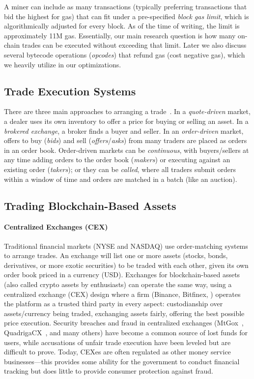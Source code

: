 A miner can include as many transactions (typically preferring transactions that bid the highest for gas) that can fit under a pre-specified \textit{block gas limit}, which is algorithmically adjusted for every block. As of the time of writing, the limit is approximately 11M gas. Essentially, our main research question is how many on-chain trades can be executed without exceeding that limit. Later we also discuss several bytecode operations (\emph{opcodes}) that refund gas (\ie cost negative gas), which we heavily utilize in our optimizations.

\subsection{Trade Execution Systems}



 There are three main approaches to arranging a trade~\cite{Har03}. In a \emph{quote-driven} market, a dealer uses its own inventory to offer a price for buying or selling an asset. In a \emph{brokered exchange}, a broker finds a buyer and seller. In an \emph{order-driven} market, offers to buy (\emph{bids}) and sell (\emph{offers}/\emph{asks}) from many traders are placed as orders in an order book. Order-driven markets can be \emph{continuous}, with buyers/sellers at any time adding orders to the order book (\emph{makers}) or executing against an existing order (\emph{takers}); or they can be \emph{called}, where all traders submit orders within a window of time and orders are matched in a batch (like an auction). 

\subsection{Trading Blockchain-Based Assets}

%

\paragraph[Centralized Exchanges (CEX)]{Centralized Exchanges (CEX)\eatpunct} Traditional financial markets (\eg NYSE and NASDAQ) use order-matching systems to arrange trades. An exchange will list one or more assets (stocks, bonds, derivatives, or more exotic securities) to be traded with each other, given its own order book priced in a currency (\eg USD). Exchanges for blockchain-based assets (also called crypto assets by enthusiasts) can operate the same way, using a centralized exchange (CEX) design where a firm (\eg Binance, Bitfinex, \etc) operates the platform as a trusted third party in every aspect: custodianship over assets/currency being traded, exchanging assets fairly, offering the best possible price execution. Security breaches and fraud in centralized exchanges  (\eg MtGox~\cite{TheHisto45:online}, QuadrigaCX~\cite{SEBIOrde83:online}, and many others) have become a common source of lost funds for users, while accusations of unfair trade execution have been leveled but are difficult to prove. Today, CEXes are often regulated as other money service businesses---this provides some ability for the government to conduct financial tracking but does little to provide consumer protection against fraud. 

